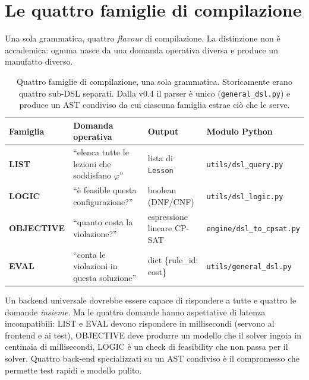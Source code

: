 \section{Le quattro famiglie di compilazione}
\label{sec:dsl-famiglie}

Una sola grammatica, quattro \emph{flavour} di compilazione. La
distinzione non \`e accademica: ognuna nasce da una domanda
operativa diversa e produce un manufatto diverso.

\begin{table}[h]
\centering
\sffamily\small
\begin{tabular}{lp{3.4cm}p{3.4cm}p{3.4cm}}
\toprule
Famiglia & Domanda operativa & Output & Modulo Python \\
\midrule
\textbf{LIST}      & ``elenca tutte le lezioni che soddisfano $\varphi$'' & lista di \texttt{Lesson} & \texttt{utils/dsl\_query.py} \\
\textbf{LOGIC}     & ``\`e feasible questa configurazione?''               & boolean (DNF/CNF) & \texttt{utils/dsl\_logic.py} \\
\textbf{OBJECTIVE} & ``quanto costa la violazione?''                      & espressione lineare CP-SAT & \texttt{engine/dsl\_to\_cpsat.py} \\
\textbf{EVAL}      & ``conta le violazioni in questa soluzione''          & dict \{rule\_id: cost\} & \texttt{utils/general\_dsl.py} \\
\bottomrule
\end{tabular}
\caption{Quattro famiglie di compilazione, una sola grammatica.
Storicamente erano quattro sub-DSL separati. Dalla v0.4 il parser
\`e unico (\texttt{general\_dsl.py}) e produce un AST condiviso da
cui ciascuna famiglia estrae ci\`o che le serve.}
\label{tab:dsl-famiglie}
\end{table}

\begin{ideabox}[title={Perch\'e quattro e non un solo backend universale}]
Un backend universale dovrebbe essere capace di rispondere a
tutte e quattro le domande \emph{insieme}. Ma le quattro
domande hanno aspettative di latenza incompatibili: LIST e
EVAL devono rispondere in millisecondi (servono al frontend e
ai test), OBJECTIVE deve produrre un modello che il solver
ingoia in centinaia di millisecondi, LOGIC \`e un check di
feasibility che non passa per il solver. Quattro back-end
specializzati su un AST condiviso \`e il compromesso che
permette test rapidi e modello pulito.
\end{ideabox}


